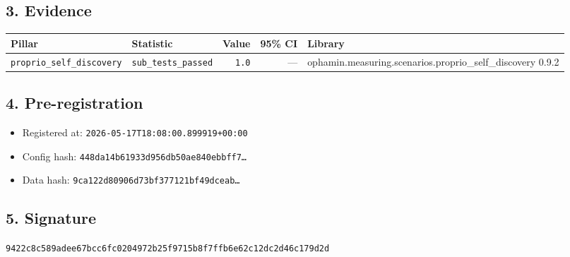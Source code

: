 \documentclass{article}
\begin{document}
\subsection*{3. Evidence}
\begin{tabular}{llrrl}\toprule
\textbf{Pillar} & \textbf{Statistic} & \textbf{Value} & \textbf{95\% CI} & \textbf{Library} \\\midrule
\texttt{proprio\_self\_discovery} & \texttt{sub\_tests\_passed} & \texttt{1.0} & --- & ophamin.measuring.scenarios.proprio\_self\_discovery 0.9.2 \\
\bottomrule\end{tabular}
\subsection*{4. Pre-registration}
\begin{itemize}
\item Registered at: \texttt{2026-05-17T18:08:00.899919+00:00}
\item Config hash: \texttt{448da14b61933d956db50ae840ebbff7\dots}
\item Data hash: \texttt{9ca122d80906d73bf377121bf49dceab\dots}
\end{itemize}
\subsection*{5. Signature}
\texttt{9422c8c589adee67bcc6fc0204972b25f9715b8f7ffb6e62c12dc2d46c179d2d}\\
\end{document}
